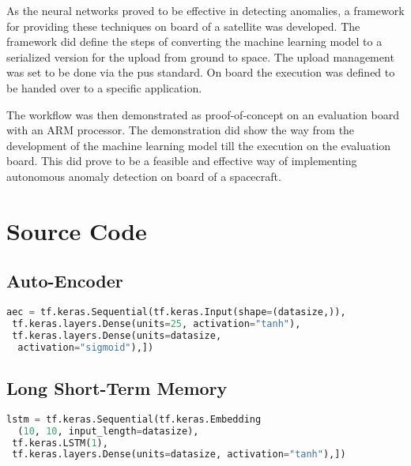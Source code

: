 {{{As the neural networks proved to be effective in detecting anomalies, a framework for providing these techniques on board of a satellite was developed. \newline
The framework did define the steps of converting the machine learning model to a serialized version for the upload from ground to space. The upload management was set to be done via the \acf{pus} standard. On board the execution was defined to be handed over to a specific application.

The workflow was then demonstrated as proof-of-concept on an evaluation board with an ARM processor. The demonstration did show the way from the development of the machine learning model till the execution on the evaluation board. \newline
This did prove to be a feasible and effective way of implementing autonomous anomaly detection on board of a spacecraft.

\renewcommand\cleardoublepage{%
 \clearpage
 \ifodd\value{page}\else\stepcounter{page}\fi
}

\appendix



\chapter{Source Code}

\section{Auto-Encoder}
\label{c:src_aec}
\begin{lstlisting}[caption={Auto-Encoder}, language=python]
aec = tf.keras.Sequential(tf.keras.Input(shape=(datasize,)),
 tf.keras.layers.Dense(units=25, activation="tanh"),
 tf.keras.layers.Dense(units=datasize, 
  activation="sigmoid"),])
\end{lstlisting}

\section{Long Short-Term Memory}
\label{c:src_lstm}
\begin{lstlisting}[caption={Long Short-Term Memory}, language=python]
lstm = tf.keras.Sequential(tf.keras.Embedding
  (10, 10, input_length=datasize),
 tf.keras.LSTM(1),
 tf.keras.layers.Dense(units=datasize, activation="tanh"),])
\end{lstlisting}

}}}
